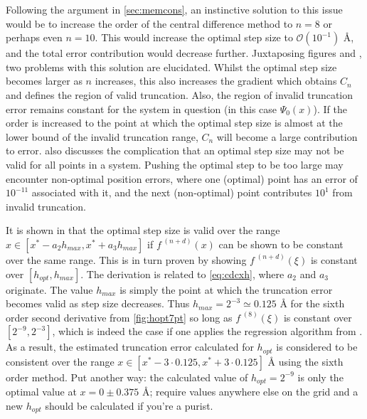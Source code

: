 Following the argument in \cref{sec:memcons}, an instinctive solution to this issue would be to increase the order of the central difference method to $n=8$ or perhaps even $n=10$.
This would increase the optimal step size to $\mathcal{O}(10^{-1})$ \AA, and the total error contribution would decrease further.
Juxtaposing figures  and , two problems with this solution are elucidated.
Whilst the optimal step size becomes larger as $n$ increases, this also increases the gradient which obtains $C_n$ and defines the region of valid truncation.
Also, the region of invalid truncation error remains constant for the system in question (in this case $\Psi_0(x)$).
If the order is increased to the point at which the optimal step size is almost at the lower bound of the invalid truncation range, $C_n$ will become a large contribution to error.
 also discusses the complication that an optimal step size may not be valid for all points in a system.
Pushing the optimal step to be too large may encounter non-optimal position errors, where one (optimal) point has an error of $10^{-11}$ associated with it, and the next (non-optimal) point contributes $10^1$ from invalid truncation.

It is shown in \citeauthor{Mathur2012} that the optimal step size is valid over the range $x \in [x^*-a_2h_{max},x^*+a_3h_{max}]$ if $f^{\;(n+d)}(x)$ can be shown to be constant over the same range.
This is in turn proven by showing $f^{\;(n+d)}(\xi)$ is constant over $[h_{opt},h_{max}]$.
The derivation is related to \cref{eq:cdcxh}, where $a_2$ and $a_3$ originate.
The value $h_{max}$ is simply the point at which the truncation error becomes valid as step size decreases.
Thus $h_{max} = 2^{-3} \simeq 0.125$ Å for the sixth order second derivative from \cref{fig:hopt7pt} so long as $f^{\;(8)}(\xi)$ is constant over $[2^{-9},2^{-3}]$, which is indeed the case if one applies the regression algorithm from .
As a result, the estimated truncation error calculated for $h_{opt}$ is considered to be consistent over the range $x \in [x^*-3\cdot0.125,x^*+3\cdot0.125]$ Å using the sixth order method.
Put another way: the calculated value of $h_{opt} = 2^{-9}$ is only the optimal value at $x=0\pm0.375$ Å; require values anywhere else on the grid and a new $h_{opt}$ should be calculated if you're a purist.

